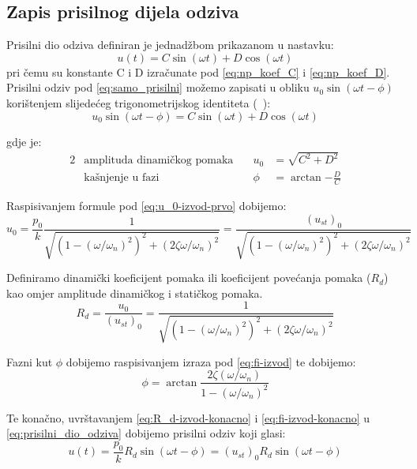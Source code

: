 \subsection{Zapis prisilnog dijela odziva}\label{ss:Prisilni_standardno}
Prisilni dio odziva definiran je jednadžbom prikazanom u nastavku:
\begin{equation}\label{eq:samo_prisilni}
    u(t)=C\sin(\omega t) + D\cos(\omega t)
\end{equation}
pri čemu su konstante C i D izračunate pod \eqref{eq:np_koef_C} i \eqref{eq:np_koef_D}.
Prisilni odziv pod \eqref{eq:samo_prisilni} možemo zapisati u obliku $u_0\sin(\omega t
- \phi)$ 
korištenjem slijedećeg trigonometrijskog identiteta (~\cite{dk_skripta}):
\begin{equation}\label{eq:prisilni_dio_odziva}
    u_0\sin(\omega t - \phi) = C\sin(\omega t) + D\cos(\omega t)
\end{equation}

gdje je:
\begin{alignat}{2}
    &\text{amplituda dinamičkog pomaka} \quad & u_0 &= \sqrt{C^2+D^2}\label{eq:u_0-izvod-prvo}\\
    &\text{kašnjenje u fazi} & \phi &= \arctan{-\frac{D}{C}}\label{eq:fi-izvod}
\end{alignat}

Raspisivanjem formule pod \eqref{eq:u_0-izvod-prvo} dobijemo:
\begin{equation}\label{eq:u_0-izvod-raspisano}
    u_0 = \frac{p_0}{k}\frac{1}{\sqrt{(1-(\omega/\omega_n)^2)^2+(2\zeta\omega/\omega_n)^2}}
        = \frac{(u_{st})_0}{\sqrt{(1-(\omega/\omega_n)^2)^2+(2\zeta\omega/\omega_n)^2}}
\end{equation}

Definiramo dinamički koeficijent pomaka ili koeficijent povećanja pomaka ($R_d$) kao omjer
amplitude dinamičkog i statičkog pomaka.
\begin{equation}\label{eq:R_d-izvod-konacno}
    R_d = \frac{u_0}{(u_{st})_0}=\frac{1}{\sqrt{(1-(\omega/\omega_n)^2)^2+(2\zeta\omega/\omega_n)^2}}
\end{equation}

Fazni kut $\phi$ dobijemo raspisivanjem izraza pod \eqref{eq:fi-izvod} te dobijemo:
\begin{equation}\label{eq:fi-izvod-konacno}
    \phi = \arctan{\frac{2\zeta(\omega/\omega_n)}{1-(\omega/\omega_n)^2}}
\end{equation}

Te konačno, uvrštavanjem \eqref{eq:R_d-izvod-konacno} i \eqref{eq:fi-izvod-konacno} u
\eqref{eq:prisilni_dio_odziva} dobijemo prisilni odziv koji glasi:
\begin{equation}
    u(t) = \frac{p_0}{k}R_d\sin(\omega t - \phi) = (u_{st})_0R_d\sin(\omega t - \phi)
\end{equation}

